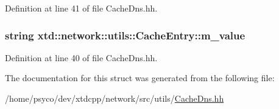 Definition at line 41 of file Cache\+Dns.\+hh.

\subsubsection[{\texorpdfstring{m\+\_\+value}{m_value}}]{\setlength{\rightskip}{0pt plus 5cm}string xtd\+::network\+::utils\+::\+Cache\+Entry\+::m\+\_\+value}\hypertarget{structxtd_1_1network_1_1utils_1_1CacheEntry_abbe786f1da8194495f1e36d8de8ba0b3}{}\label{structxtd_1_1network_1_1utils_1_1CacheEntry_abbe786f1da8194495f1e36d8de8ba0b3}


Definition at line 40 of file Cache\+Dns.\+hh.



The documentation for this struct was generated from the following file\+:\begin{DoxyCompactItemize}
\item 
/home/psyco/dev/xtdcpp/network/src/utils/\hyperlink{CacheDns_8hh}{Cache\+Dns.\+hh}\end{DoxyCompactItemize}
